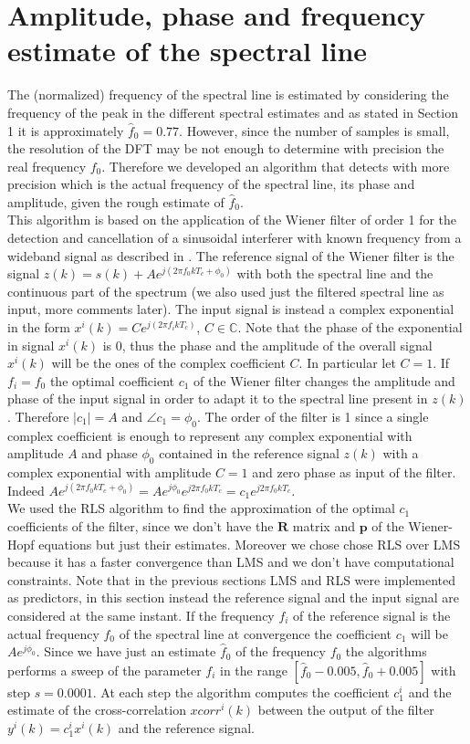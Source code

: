 \documentclass[10pt]{article}
\numberwithin{equation}{section}
\begin{document}
\section{Amplitude, phase and frequency estimate of the spectral line}

The (normalized) frequency of the spectral line is estimated by considering the frequency of the peak in the different spectral estimates and as stated in Section 1 it is approximately $\hat{f}_0 = 0.77$. However, since the number of samples is small, the resolution of the DFT may be not enough to determine with precision the real frequency $f_0$. Therefore we developed an algorithm that detects with more precision which is the actual frequency of the spectral line, its phase and amplitude, given the rough estimate of $\hat{f}_0$. \\
This algorithm is based on the application of the Wiener filter of order 1 for the detection and cancellation of a sinusoidal interferer with known frequency from a wideband signal as described in \cite{bc}.
The reference signal of the Wiener filter is the signal $z(k) = s(k) + Ae^{j(2 \pi f_0 k T_c + \phi_0)}$ with both the spectral line and the continuous part of the spectrum (we also used just the filtered spectral line as input, more comments later). The input signal is instead a complex exponential in the form $x^i(k) = C e^{j (2 \pi f_i k T_c)}$, $C \in \mathbb{C}$. Note that the phase of the exponential in signal $x^i(k)$ is 0, thus the phase and the amplitude of the overall signal $x^i(k)$ will be the ones of the complex coefficient $C$. In particular let $C = 1$. If $f_i = f_0$ the optimal coefficient $c_1$ of the Wiener filter changes the amplitude and phase of the input signal in order to adapt it to the spectral line present in $z(k)$. Therefore $|c_1| = A$ and $\angle{c_1} = \phi_0$.  The order of the filter is 1 since a single complex coefficient is enough to represent any complex exponential with amplitude $A$ and phase $\phi_0$ contained in the reference signal $z(k)$ with a complex exponential with amplitude $C = 1$ and zero phase as input of the filter. Indeed $Ae^{j(2 \pi f_0 k T_c + \phi_0)} = Ae^{j\phi_0}e^{j2 \pi f_0 k T_c} = c_1 e^{j2 \pi f_0 k T_c}$.\\
We used the RLS algorithm to find the approximation of the optimal $c_1$ coefficients of the filter, since we don't have the $\mathbf{R}$ matrix and $\mathbf{p}$ of the Wiener-Hopf equations but just their estimates. Moreover we chose chose RLS over LMS because it has a faster convergence than LMS and we don't have computational constraints. Note that in the previous sections LMS and RLS were implemented as predictors, in this section instead the reference signal and the input signal are considered at the same instant. If the frequency $f_i$ of the reference signal is the actual frequency $f_0$ of the spectral line at convergence the coefficient $c_1$ will be $A e^{j\phi_0}$. Since we have just an estimate $\hat{f}_0$ of the frequency $f_0$ the algorithms performs a sweep of the parameter $f_i$ in the range $[\hat{f}_0 - 0.005, \hat{f}_0 + 0.005]$ with step $s = 0.0001$. At each step the algorithm computes the coefficient $c_1^i$ and the estimate of the cross-correlation $xcorr^i(k)$ between the output of the filter $y^i(k) = c_1^i x^i(k)$ and the reference signal.
\end{document}
